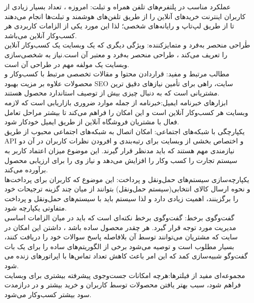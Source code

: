 \documentclass[14pt]{article}
\begin{document}
\begin{flushright}
\begin{itemize}
عملکرد مناسب در پلتفرم‌های تلفن همراه و تبلت: امروزه ، تعداد بسیار زیادی از کاربران اینترنت خریدهای آنلاین را از طریق تلفن‌های هوشمند و تبلت‌ها انجام می‌دهند تا از طریق لپ‌تاپ و رایانه‌های شخصی؛ لذا این مورد یکی از الزامات کاربردی هر کسب‌وکار آنلاین می‌باشد.\\
طٰراحی منحصر به‌فرد و متمایزکننده: ویژگی دیگری که یک وبسایت یک کسب‌وکار آنلاین را تعریف می‌کند ، طراحی منحصر به‌فرد و معتبر آن است.نیاز به شخصی‌سازی وبسایت یک مولفه مهم در طراحی آن است.\\
مطالب مرتبط و مفید: قراردادن محتوا و مقالات تخصصی مرتبط با کسب‌وکار و محصولات علاوه بر مزیت بهبود SEO سایت، راهی برای تأمین نیازهای دقیق ترین مشتریانی است که به دنبال چیزی بیش از توصیف استاندارد محصول هستند.\\
ابزارهای خبرنامه ایمیل:خبرنامه از جمله موارد ضروری بازاریابی است که لازمه وبسایت هر کسب‌وکار آنلاین است و  این امکان را فراهم می‌کند تا بیشتر مراحل تعامل فعال با مشتریان فروشگاه آنلاین از طریق ایمیل خودکار شود.\\ 
یکپارچگی با شبکه‌های اجتماعی: امکان اتصال به  شبکه‌های اجتماعی محبوب از طریق API و اختصاص بخشی از وبسایت برای رتبه‌بندی و افرودن نظرات کاربران در آن دو نیازمندی مهم هستند که باید مدنظر قرار گیرند. این  موضوع میزان اعتماد کاربر به سیستم تجارت را کسب وکار را افزایش می‌دهد و نیاز وی را برای ارزیابی محصول برآورده می‌کند.\\
یکپارچه‌سازی سیستم‌های حمل‌ونقل و پرداخت: این موضوع که کاربران برای پرداخت‌ها و نحوه ارسال کالای انتخابی(سیستم حمل‌ونقل) بتوانند از میان چند گزینه ترجیحات خود را برگزینند، اهمیت زیادی دارد و لذا سیستم باید با سیستم‌های حمل‌ونقل و پرداخت متفاوتی یکپارچه شود.\\
گفت‌وگوی برخط: گفت‌وگوی برخط نکته‌ای است که باید در میان الزامات اساسی مدیریت مورد توجه قرار گیرد. هر چقدر محصول ساده باشد ، داشتن این امکان در سایت که مشتریان می‌توانند توسط آن بلافاصله پاسخ سوالات خود را دریافت کنند، بسیار مطلوب است و توصیه می‌شود برخی از الگوریتم‌های ساده را برای یک بات گفت‌وگو شبیه‌سازی کمد که این امر باعث کاهش تعداد تماس‌ها با اپراتورهای زنده می شود.\\
مجموعه‌ای مفید از فیلترها:هرچه امکانات جست‌وجوی پیشرفته بیشتری برای وبسایت فراهم شود، سبب بهتر یافتن محصولات توسط کاربران و خرید بیشتر و در درازمدت سود بیشتر کسب‌وکار می‌شود.
\end{itemize}
\end{flushright}
\end{document}
